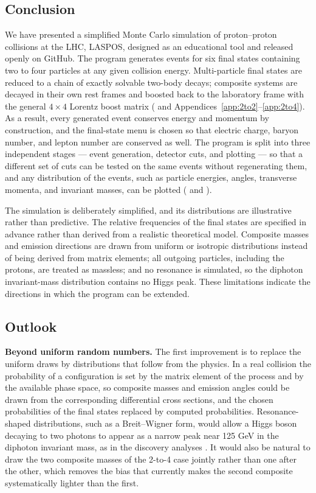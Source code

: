 \documentclass{article}
\begin{document}
\subsection{Conclusion}
We have presented a simplified Monte Carlo simulation of proton--proton collisions at the LHC, LASPOS, designed as an educational tool and released openly on GitHub. The program generates events for six final states containing two to four particles at any given collision energy. Multi-particle final states are reduced to a chain of exactly solvable two-body decays; composite systems are decayed in their own rest frames and boosted back to the laboratory frame with the general $4\times4$ Lorentz boost matrix ( and Appendices~\ref{app:2to2}--\ref{app:2to4}). As a result, every generated event conserves energy and momentum by construction, and the final-state menu is chosen so that electric charge, baryon number, and lepton number are conserved as well. The program is split into three independent stages --- event generation, detector cuts, and plotting --- so that a different set of cuts can be tested on the same events without regenerating them, and any distribution of the events, such as particle energies, angles, transverse momenta, and invariant masses, can be plotted ( and ).

\par The simulation is deliberately simplified, and its distributions are illustrative rather than predictive. The relative frequencies of the final states are specified in advance rather than derived from a realistic theoretical model. Composite masses and emission directions are drawn from uniform or isotropic distributions instead of being derived from matrix elements; all outgoing particles, including the protons, are treated as massless; and no resonance is simulated, so the diphoton invariant-mass distribution contains no Higgs peak. These limitations indicate the directions in which the program can be extended.

\subsection{Outlook}
\par\textbf{Beyond uniform random numbers.} The first improvement is to replace the uniform draws by distributions that follow from the physics. In a real collision the probability of a configuration is set by the matrix element of the process and by the available phase space, so composite masses and emission angles could be drawn from the corresponding differential cross sections, and the chosen probabilities of the final states replaced by computed probabilities. Resonance-shaped distributions, such as a Breit--Wigner form, would allow a Higgs boson decaying to two photons to appear as a narrow peak near 125 GeV in the diphoton invariant mass, as in the discovery analyses \cite{atlas_higgs, cms_higgs}. It would also be natural to draw the two composite masses of the 2-to-4 case jointly rather than one after the other, which removes the bias that currently makes the second composite systematically lighter than the first.
\end{document}

